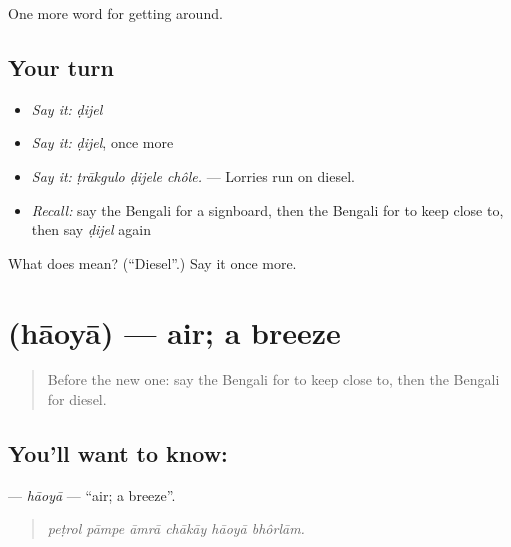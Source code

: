 \begin{grammarlens}[title={What you've built}]
One more word for getting around.
\end{grammarlens}

\subsection*{Your turn}
\begin{itemize}
\raggedright
  \item \emph{Say it:} \emph{ḍijel}
  \item \emph{Say it:} \emph{ḍijel}, once more
  \item \emph{Say it:} \emph{ṭrākgulo ḍijele chôle.} — Lorries run on diesel.
  \item \emph{Recall:} say the Bengali for a signboard, then the Bengali for to keep close to, then say \emph{ḍijel} again
\end{itemize}

\begin{tcolorbox}[breakable,colback=teal!4,colframe=teal!35!black,title={Before you move on}]
What does  mean? (\textquotedblleft{}Diesel\textquotedblright{}.) Say it once more.
\end{tcolorbox}
\section[\texorpdfstring{\bn{হাওয়া} (hāoyā)}{হাওয়া (hāoyā)}]{ (hāoyā) — air; a breeze}

\label{lesson:BN-C393-haoya}



\begin{quote}
Before the new one: say the Bengali for to keep close to, then the Bengali for diesel.
\end{quote}

\subsection*{You'll want to know: }
\textbf{} — \emph{hāoyā} — \textquotedblleft{}air; a breeze\textquotedblright{}.

\begin{quote}
     
\end{quote}

\begin{quote}
\emph{peṭrol pāmpe āmrā chākāy hāoyā bhôrlām.}
\end{quote}


